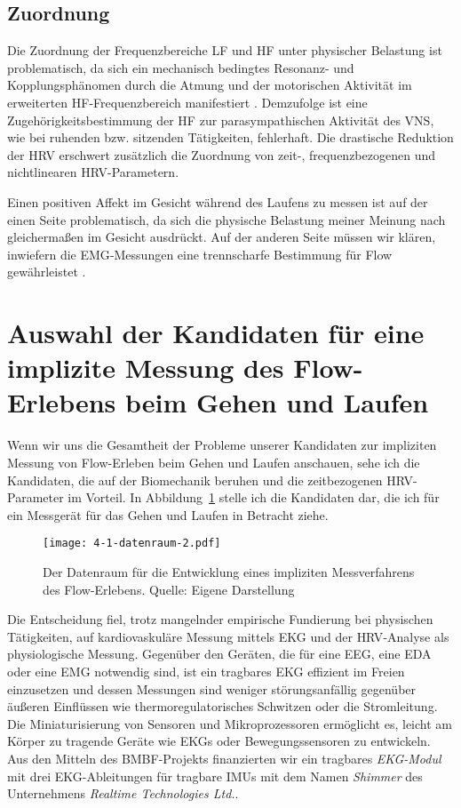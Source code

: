 \subsection{Zuordnung}
\label{sub:zuordnung}
Die Zuordnung der Frequenzbereiche \ac{LF} und \ac{HF} unter physischer Belastung ist problematisch, da sich ein mechanisch bedingtes Resonanz- und Kopplungsphänomen durch die Atmung und der motorischen Aktivität im erweiterten \ac{HF}-Frequenzbereich manifestiert \citep[vgl.][S.~62]{Hoos2010}. Demzufolge ist eine Zugehörigkeitsbestimmung der \ac{HF} zur parasympathischen Aktivität des \ac{VNS}, wie bei ruhenden bzw. sitzenden Tätigkeiten, fehlerhaft. Die drastische Reduktion der \ac{HRV} erschwert zusätzlich die Zuordnung von zeit-, frequenzbezogenen und nichtlinearen \ac{HRV}-Parametern.

Einen positiven Affekt im Gesicht während des Laufens zu messen ist auf der einen Seite problematisch, da sich die physische Belastung meiner Meinung nach gleichermaßen im Gesicht ausdrückt. Auf der anderen Seite müssen wir klären, inwiefern die \ac{EMG}-Messungen eine trennscharfe Bestimmung für Flow gewährleistet \citep[vgl.][]{Peifer2012}.

\section{Auswahl der Kandidaten für eine implizite Messung des Flow-Erlebens beim Gehen und Laufen}
\label{sec:auswahl_der_kandidaten}
Wenn wir uns die Gesamtheit der Probleme unserer Kandidaten zur impliziten Messung von Flow-Erleben beim Gehen und Laufen anschauen, sehe ich die Kandidaten, die auf der Biomechanik beruhen und die zeitbezogenen \ac{HRV}-Parameter im Vorteil. In Abbildung~\ref{fig:4_1_datenraum} stelle ich die Kandidaten dar, die ich für ein Messgerät für das Gehen und Laufen in Betracht ziehe.

\begin{figure}[t]
	\centering
		\texttt{[image: 4-1-datenraum-2.pdf]}
	\caption[Der Datenraum für die Entwicklung eines impliziten Messverfahrens des Flow-Erlebens]{Der Datenraum für die Entwicklung eines impliziten Messverfahrens des Flow-Erlebens. Quelle: Eigene Darstellung}
	\label{fig:4_1_datenraum}
\end{figure}

Die Entscheidung fiel, trotz mangelnder empirische Fundierung bei physischen Tätigkeiten, auf kardiovaskuläre Messung mittels \ac{EKG} und der \ac{HRV}-Analyse als physiologische Messung. Gegenüber den Geräten, die für eine \ac{EEG}, eine \ac{EDA} oder eine \ac{EMG} notwendig sind, ist ein tragbares \ac{EKG} effizient im Freien einzusetzen und dessen Messungen sind weniger störungsanfällig gegenüber äußeren Einflüssen wie thermoregulatorisches Schwitzen oder die Stromleitung. Die Miniaturisierung von Sensoren und Mikroprozessoren ermöglicht es, leicht am Körper zu tragende Geräte wie \acp{EKG} oder Bewegungssensoren zu entwickeln. Aus den Mitteln des \acs{BMBF}-Projekts finanzierten wir ein tragbares \emph{EKG-Modul} mit drei \ac{EKG}-Ableitungen für tragbare \acp{IMU} mit dem Namen \emph{Shimmer} des Unternehmens \emph{Realtime Technologies Ltd.}.

